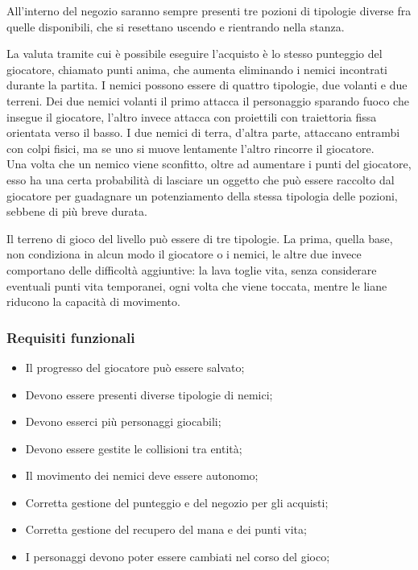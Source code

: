 \documentclass[a4paper,12pt]{report}
\begin{document}
All'interno del negozio saranno sempre presenti tre pozioni di tipologie diverse fra quelle disponibili, che si resettano uscendo e rientrando nella stanza.

La valuta tramite cui è possibile eseguire l’acquisto è lo stesso punteggio del giocatore, chiamato punti anima, che aumenta eliminando i nemici incontrati durante la partita.
%
I nemici possono essere di quattro tipologie, due volanti e due terreni. Dei due nemici volanti il primo attacca il personaggio sparando fuoco che insegue il giocatore, l'altro invece attacca con proiettili con traiettoria fissa orientata verso il basso. I due nemici di terra, d'altra parte, attaccano entrambi con colpi fisici, ma se uno si muove lentamente l'altro rincorre il giocatore. 
\\
Una volta che un nemico viene sconfitto, oltre ad aumentare i punti del giocatore, esso ha una certa probabilità di lasciare un oggetto che può essere raccolto dal giocatore per guadagnare un potenziamento della stessa tipologia delle pozioni, sebbene di più breve durata.

Il terreno di gioco del livello può essere di tre tipologie. La prima, quella base, non condiziona in alcun modo il giocatore o i nemici, le altre due invece comportano delle difficoltà aggiuntive: la lava toglie vita, senza considerare eventuali punti vita temporanei, ogni volta che viene toccata, mentre le liane riducono la capacità di movimento. 

\subsubsection{Requisiti funzionali}

\begin{itemize}
    \item Il progresso del giocatore può essere salvato;
    \item Devono essere presenti diverse tipologie di nemici;
    \item Devono esserci più personaggi giocabili;
    \item Devono essere gestite le collisioni tra entità;
    \item Il movimento dei nemici deve essere autonomo;
    \item Corretta gestione del punteggio e del negozio per gli acquisti;
    \item Corretta gestione del recupero del mana e dei punti vita;
    \item I personaggi devono poter essere cambiati nel corso del gioco;
\end{itemize}
\end{document}
